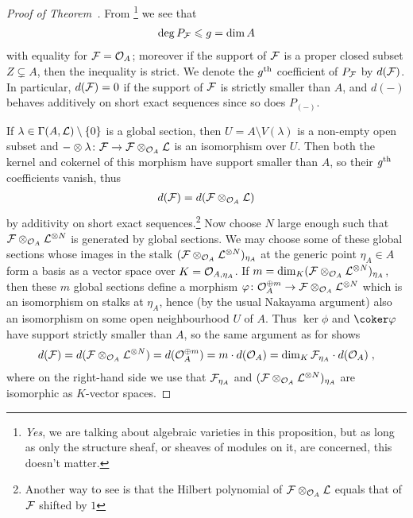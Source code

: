 \documentclass[a4paper,parskip=half,numbers=enddot, DIV=12]{scrreprt}
\renewcommand{\leq}{\leqslant}
\begin{document}
\begin{proof}[Proof of Theorem~]
	From \cite[Proposition~3.1.3]{alg2}\footnote{\emph{Yes}, we are talking about algebraic varieties in this proposition, but as long as only the structure sheaf, or sheaves of modules on it, are concerned, this doesn't matter.} we see that
	\begin{align*}
		\deg P_{\Ff}\leq g=\dim A
	\end{align*}
	with equality for $\mathcal{F}=\mathcal{O}_A$; moreover if the support of $\mathcal{F}$ is a proper closed subset $Z\subsetneq A$, then the inequality is strict. We denote the $g^{\text{th}}$ coefficient of $P_{\mathcal{F}}$ by $d(\mathcal{F})$. In particular, $d(\mathcal{F})=0$ if the support of $\mathcal{F}$ is strictly smaller than $A$, and $d(-)$ behaves additively on short exact sequences since so does $P_{(-)}$.
	
	If $\lambda\in\Gamma(A,\mathcal{L})\setminus \{0\}$ is a global section, then $U=A\setminus V(\lambda)$ is a non-empty open subset and $-\otimes\lambda\colon \Ff\morphism\Ff\otimes_{\Oo_A}\Ll$ is an isomorphism over $U$. Then both the kernel and cokernel of this morphism have support smaller than $A$, so their $g^{\text{th}}$ coefficients vanish, thus
	\begin{align}\lbl{eq:dLShift}
		d(\Ff)=d(\Ff\otimes_{\Oo_A}\Ll)
	\end{align}
	by additivity on short exact sequences.\footnote{Another way to see  is that the Hilbert polynomial of $\mathcal{F}\otimes_{\mathcal{O}_A}\mathcal{L}$ equals that of $\mathcal{F}$ shifted by $1$} Now choose $N$ large enough such that $\mathcal{F}\otimes_{\mathcal{O}_A}\mathcal{L}^{\otimes N}$ is generated by global sections. We may choose some of these global sections whose images in the stalk $(\mathcal{F}\otimes_{\mathcal{O}_A}\mathcal{L}^{\otimes N})_{\eta_A}$ at the generic point $\eta_A\in A$ form a basis as a vector space over $K=\mathcal{O}_{A,\eta_A}$. If $m=\dim_K(\mathcal{F}\otimes_{\mathcal{O}_A}\mathcal{L}^{\otimes N})_{\eta_A}$, then these $m$ global sections define a morphism $\phi\colon \Oo_A^{\oplus m}\morphism \Ff\otimes_{\Oo_A}\Ll^{\otimes N}$ which is an isomorphism on stalks at $\eta_A$, hence (by the usual Nakayama argument) also an isomorphism on some open neighbourhood $U$ of $A$. Thus $\ker\phi$ and $\coker \phi$ have support strictly smaller than $A$, so the same argument as for  shows
	\begin{align}\lbl{eq:dFormula}
		d(\Ff)=d(\Ff\otimes_{\Oo_A}\Ll^{\otimes N})=d(\Oo_A^{\oplus m})=m\cdot d(\Oo_A)=\dim_K\Ff_{\eta_A}\cdot d(\Oo_A)\;,
	\end{align}
	where on the right-hand side we use that $\mathcal{F}_{\eta_A}$ and $(\mathcal{F}\otimes_{\mathcal{O}_A}\mathcal{L}^{\otimes N})_{\eta_A}$ are isomorphic as $K$-vector spaces.
	

\end{proof}
\end{document}
